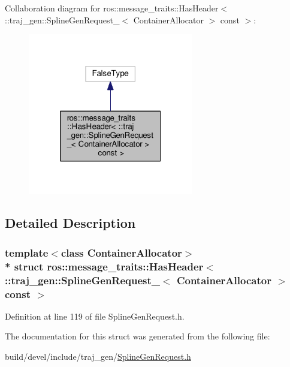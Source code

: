Collaboration diagram for ros\+:\+:message\+\_\+traits\+:\+:Has\+Header$<$ \+:\+:traj\+\_\+gen\+:\+:Spline\+Gen\+Request\+\_\+$<$ Container\+Allocator $>$ const $>$\+:
\nopagebreak
\begin{figure}[H]
\begin{center}
\leavevmode
\includegraphics[width=205pt]{structros_1_1message__traits_1_1_has_header_3_01_1_1traj__gen_1_1_spline_gen_request___3_01_cont09eeeac25a1841f77cb680a359d6fe90}
\end{center}
\end{figure}


\subsection{Detailed Description}
\subsubsection*{template$<$class Container\+Allocator$>$\\*
struct ros\+::message\+\_\+traits\+::\+Has\+Header$<$ \+::traj\+\_\+gen\+::\+Spline\+Gen\+Request\+\_\+$<$ Container\+Allocator $>$ const  $>$}



Definition at line 119 of file Spline\+Gen\+Request.\+h.



The documentation for this struct was generated from the following file\+:\begin{DoxyCompactItemize}
\item 
build/devel/include/traj\+\_\+gen/\hyperlink{_spline_gen_request_8h}{Spline\+Gen\+Request.\+h}\end{DoxyCompactItemize}

